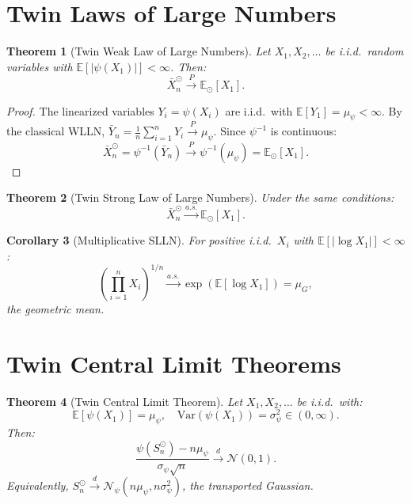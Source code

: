 \documentclass[11pt,twoside,openright]{book}
\theoremstyle{plain}
\newtheorem{theorem}{Theorem}[chapter]
\newtheorem{corollary}[theorem]{Corollary}
\theoremstyle{definition}
\theoremstyle{remark}
\newcommand{\calN}{\mathcal{N}}
\newcommand{\E}{\mathbb{E}}
\newcommand{\var}{\mathrm{Var}}
\newcommand{\twin}{\odot}
\newcommand{\Etwin}{\mathbb{E}_{\twin}}
\begin{document}
\section{Twin Laws of Large Numbers}

\begin{theorem}[Twin Weak Law of Large Numbers]
\label{thm:twin-wlln}
Let $X_1, X_2, \ldots$ be i.i.d.\ random variables with $\E[|\psi(X_1)|] < \infty$. Then:
\begin{equation}
\bar{X}_n^{\twin} \xrightarrow{P} \Etwin[X_1].
\label{eq:twin-wlln}
\end{equation}
\end{theorem}

\begin{proof}
The linearized variables $Y_i = \psi(X_i)$ are i.i.d.\ with $\E[Y_1] = \mu_\psi < \infty$. By the classical WLLN, $\bar{Y}_n = \frac{1}{n}\sum_{i=1}^n Y_i \xrightarrow{P} \mu_\psi$. Since $\psi^{-1}$ is continuous:
\[
\bar{X}_n^{\twin} = \psi^{-1}(\bar{Y}_n) \xrightarrow{P} \psi^{-1}(\mu_\psi) = \Etwin[X_1].
\]
\end{proof}

\begin{theorem}[Twin Strong Law of Large Numbers]
\label{thm:twin-slln}
Under the same conditions:
\begin{equation}
\bar{X}_n^{\twin} \xrightarrow{a.s.} \Etwin[X_1].
\label{eq:twin-slln}
\end{equation}
\end{theorem}

\begin{corollary}[Multiplicative SLLN]
For positive i.i.d.\ $X_i$ with $\E[|\log X_1|] < \infty$:
\begin{equation}
\left(\prod_{i=1}^n X_i\right)^{1/n} \xrightarrow{a.s.} \exp(\E[\log X_1]) = \mu_G,
\label{eq:mult-slln}
\end{equation}
the geometric mean.
\end{corollary}

\section{Twin Central Limit Theorems}

\begin{theorem}[Twin Central Limit Theorem]
\label{thm:twin-clt}
Let $X_1, X_2, \ldots$ be i.i.d.\ with:
\[
\E[\psi(X_1)] = \mu_\psi, \quad \var(\psi(X_1)) = \sigma_\psi^2 \in (0, \infty).
\]
Then:
\begin{equation}
\frac{\psi(S_n^{\twin}) - n\mu_\psi}{\sigma_\psi \sqrt{n}} \xrightarrow{d} \calN(0, 1).
\label{eq:twin-clt}
\end{equation}
Equivalently, $S_n^{\twin} \xrightarrow{d} \calN_\psi(n\mu_\psi, n\sigma_\psi^2)$, the transported Gaussian.
\end{theorem}
\end{document}
